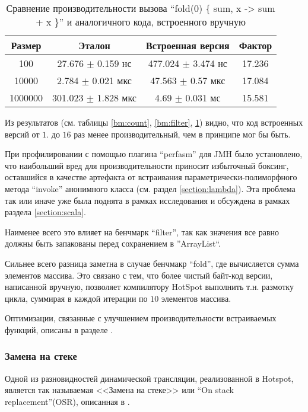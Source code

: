 \begin{table}[h]
\begin{center}
\begin{tabular}{|c|c|c|c|} \hline
Размер & Эталон & Встроенная версия & Фактор \\ \hline
100 & 27.676 $\pm$ 0.159 нс & 477.024 $\pm$ 3.474 нс & 17.236\\ \hline
10000 & 2.784 $\pm$ 0.021 мкс & 47.563 $\pm$ 0.57 мкс & 17.084\\ \hline
1000000 & 301.023 $\pm$ 1.828 мкс & 4.69 $\pm$ 0.031 мс & 15.581\\ \hline
\end{tabular}
\caption{Сравнение производительности вызова ``fold(0) \{ sum, x -> sum + x \}'' и аналогичного кода, встроенного вручную}
\label{bm:fold}
\end{center}
\end{table}

Из результатов (см. таблицы \ref{bm:count}, \ref{bm:filter}, \ref{bm:fold}) видно, что код
встроенных версий от $1.$ до $16$ раз менее производительный, чем в принципе мог бы быть.

При профилировании с помощью плагина ``perfasm'' для JMH было установлено, что наибольший вред
для производительности приносит избыточный боксинг, оставшийся в качестве артефакта от встраивания
параметрически-полиморфного метода ``invoke'' анонимного класса (см. раздел \ref{section:lambda}).
Эта проблема так или иначе уже была поднята в рамках исследования\cite{ScalaDragos} и обсуждена
в рамках раздела \ref{section:scala}.

Наименее всего это влияет на бенчмарк ``filter'', так как значения все равно должны быть запакованы
перед сохранением в ''ArrayList``.

Сильнее всего разница заметна в случае бенчмакр ``fold'', где вычисляется сумма элементов массива.
Это связано с тем, что более чистый байт-код версии, написанной вручную, позволяет компилятору
HotSpot выполнить т.н. размотку цикла, суммирая в каждой итерации по $10$ элементов массива.

Оптимизации, связанные с улучшением производительности встраиваемых функций, описаны в разделе . %

\subsubsection{Замена на стеке}
\label{section:osr:bm}
Одной из разновидностей динамической трансляции, реализованной в Hotspot, является так называемая
<<Замена на стеке>> или ``On stack replacement''(OSR), описанная в \cite{HotspotServer}.

